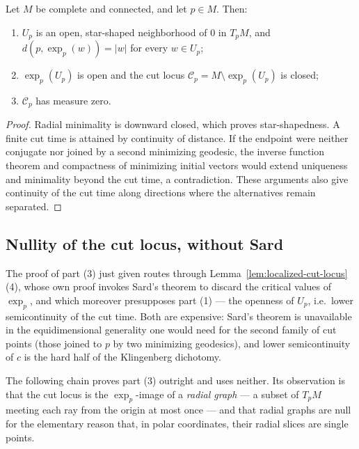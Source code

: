 \begin{lemma}
\label{lem:cut-locus-properties}
\leanok

Let $M$ be complete and connected, and let $p\in M$. Then:
\begin{enumerate}
\item $U_p$ is an open, star-shaped neighborhood of $0$ in
$T_pM$, and $d(p,\exp_p(w))=|w|$ for every $w\in U_p$;
\item $\exp_p(U_p)$ is open and the cut locus
${\mathcal C}_p=M\setminus\exp_p(U_p)$ is closed;
\item ${\mathcal C}_p$ has measure zero.
\end{enumerate}
\end{lemma}

\begin{proof}
\sketch
{}
Radial minimality is downward closed, which proves star-shapedness. A finite cut time is attained by continuity of distance. If the endpoint were neither conjugate nor joined by a second minimizing geodesic, the inverse function theorem and compactness of minimizing initial vectors would extend uniqueness and minimality beyond the cut time, a contradiction. These arguments also give continuity of the cut time along directions where the alternatives remain separated.
\end{proof}

\subsection*{Nullity of the cut locus, without Sard}

The proof of part (3) just given routes through
Lemma~\ref{lem:localized-cut-locus}(4), whose own proof invokes Sard's
theorem to discard the critical values of $\exp_p$, and which
moreover presupposes part (1) --- the openness of $U_p$, i.e.\ lower
semicontinuity of the cut time. Both are expensive: Sard's theorem is
unavailable in the equidimensional generality one would need for the
second family of cut points (those joined to $p$ by two minimizing
geodesics), and lower semicontinuity of $c$ is the hard half of the
Klingenberg dichotomy.

The following chain proves part (3) outright and uses neither. Its
observation is that the cut locus is the $\exp_p$-image of a
\emph{radial graph} --- a subset of $T_pM$ meeting each ray from the
origin at most once --- and that radial graphs are null for the
elementary reason that, in polar coordinates, their radial slices are
single points.

